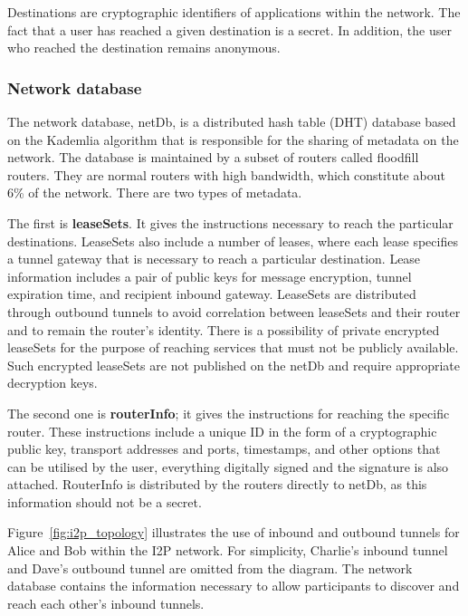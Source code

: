 Destinations are cryptographic identifiers of applications within the network. The fact that a user has reached a given destination is a secret. In addition, the user who reached the destination remains anonymous.

\subsubsection{Network database}
The network database, netDb, is a distributed hash table (DHT) database based on the Kademlia algorithm that is responsible for the sharing of metadata on the network. The database is maintained by a subset of routers called floodfill routers. They are normal routers with high bandwidth, which constitute about 6\% of the network. There are two types of metadata. 

The first is \textbf{leaseSets}. It gives the instructions necessary to reach the particular destinations. LeaseSets also include a number of leases, where each lease specifies a tunnel gateway that is necessary to reach a particular destination. Lease information includes a pair of public keys for message encryption, tunnel expiration time, and recipient inbound gateway. LeaseSets are distributed through outbound tunnels to avoid correlation between leaseSets and their router and to remain the router’s identity. There is a possibility of private encrypted leaseSets for the purpose of reaching services that must not be publicly available. Such encrypted leaseSets are not published on the netDb and require appropriate decryption keys.

The second one is \textbf{routerInfo}; it gives the instructions for reaching the specific router. These instructions include a unique ID in the form of a cryptographic public key,  transport addresses and ports, timestamps, and other options that can be utilised by the user, everything digitally signed and the signature is also attached. RouterInfo is distributed by the routers directly to netDb, as this information should not be a secret.

Figure~\ref{fig:i2p_topology} illustrates the use of inbound and outbound tunnels for Alice and Bob within the I2P network. For simplicity, Charlie's inbound tunnel and Dave's outbound tunnel are omitted from the diagram. The network database contains the information necessary to allow participants to discover and reach each other's inbound tunnels.

